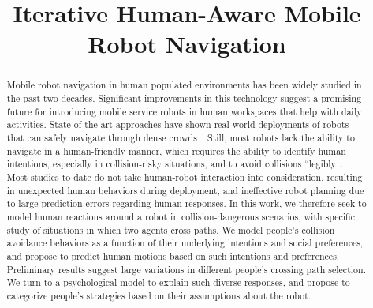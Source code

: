 \documentclass[conference]{IEEEtran}
\begin{document}
\title{Iterative Human-Aware Mobile Robot Navigation}


\author{
}


\maketitle

\begin{abstract}
Mobile robot navigation in human populated environments has been
widely studied in the past two decades. Significant improvements in
this technology suggest a promising future for introducing mobile
service robots in human workspaces that help with daily
activities. State-of-the-art approaches have shown real-world
deployments of robots that can safely navigate through dense
crowds~\cite{trautman2015robot, pfeiffer2016predicting}. Still, most
robots lack the ability to navigate in a human-friendly manner, which
requires the ability to identify human intentions, especially 
in collision-risky situations, and to avoid collisions 
“legibly~\cite{dragan2013legibility}.
Most studies to date do not
take human-robot interaction into consideration, resulting in
unexpected human behaviors during deployment, and ineffective robot planning 
due to large prediction errors regarding human responses. In this work, we 
therefore seek to model human reactions around a robot in collision-dangerous 
scenarios, with specific study of situations in which two agents cross paths. 
We model people's collision avoidance behaviors as a function of their 
underlying intentions and social preferences, and propose to predict human motions based on such 
intentions and preferences. Preliminary results suggest large variations in different people's 
crossing path selection. We turn to a psychological model 
to explain such diverse responses, and propose to categorize people's 
strategies based on their assumptions about the robot. 

\end{abstract}
\end{document}
